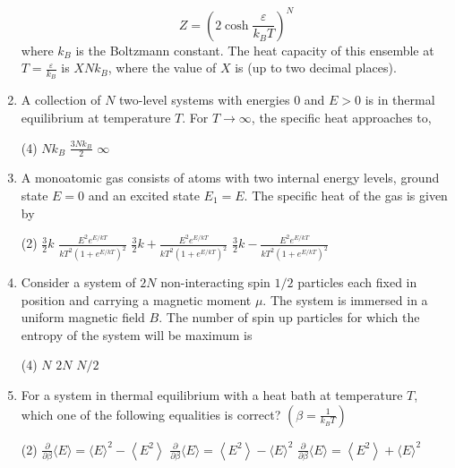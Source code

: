 \begin{enumerate}
	$$
	Z=\left(2 \cosh \frac{\varepsilon}{k_{B} T}\right)^{N}
	$$
	where $k_{B}$ is the Boltzmann constant. The heat capacity of this ensemble at $T=\frac{\varepsilon}{k_{B}}$ is $X N k_{B}$, where the value of $X$ is (up to two decimal places).
	{}
	\item A collection of $N$ two-level systems with energies 0 and $E>0$ is in thermal
	equilibrium at temperature $T$. For $T \rightarrow \infty$, the specific heat approaches to,
	{}
	\begin{tasks}(4)
		\task[\textbf{B.}] $N k_{B}$
		\task[\textbf{C.}] $\frac{3 N k_{B}}{2}$
		\task[\textbf{D.}] $\infty$
	\end{tasks}
	\item  A monoatomic gas consists of atoms with two internal energy levels, ground state $E=0$ and an excited state $E_{1}=E$. The specific heat of the gas is given by
	{}
	\begin{tasks}(2)
		\task[\textbf{A.}] $\frac{3}{2} k$
		\task[\textbf{B.}] $\frac{E^{2} e^{E / k T}}{k T^{2}\left(1+e^{E / k T}\right)^{2}}$
		\task[\textbf{C.}] $\frac{3}{2} k+\frac{E^{2} e^{E / k T}}{k T^{2}\left(1+e^{E / k T}\right)^{2}}$
		\task[\textbf{D.}] $\frac{3}{2} k-\frac{E^{2} e^{E / k T}}{k T^{2}\left(1+e^{E / k T}\right)^{2}}$
	\end{tasks}
	\item Consider a system of $2 N$ non-interacting spin $1 / 2$ particles each fixed in position and carrying a magnetic moment $\mu$. The system is immersed in a uniform magnetic field $B$. The number of spin up particles for which the entropy of the system will be maximum is
	{}
	\begin{tasks}(4)
		\task[\textbf{B.}] $N$
		\task[\textbf{C.}] $2 N$
		\task[\textbf{D.}] $N / 2$
	\end{tasks}
	\item For a system in thermal equilibrium with a heat bath at temperature $T$, which one of the following equalities is correct? $\left(\beta=\frac{1}{k_{B} T}\right)$
	{}
	\begin{tasks}(2)
		\task[\textbf{A.}] $\frac{\partial}{\partial \beta}\langle E\rangle=\langle E\rangle^{2}-\left\langle E^{2}\right\rangle$
		\task[\textbf{B.}] $\frac{\partial}{\partial \beta}\langle E\rangle=\left\langle E^{2}\right\rangle-\langle E\rangle^{2}$
		\task[\textbf{C.}] $\frac{\partial}{\partial \beta}\langle E\rangle=\left\langle E^{2}\right\rangle+\langle E\rangle^{2}$

\end{tasks}
\end{enumerate}
